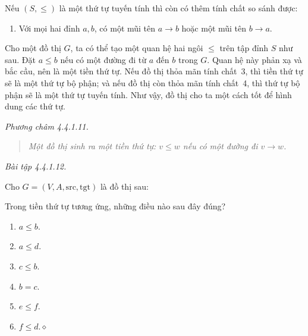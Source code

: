 Nếu $(S,\le)$ là một thứ tự tuyến tính thì còn có thêm tính chất so sánh được:
\begin{enumerate}[resume]
\item Với mọi hai đỉnh $a,b$, có một mũi tên $a\to b$ hoặc một mũi tên $b\to a$.
\end{enumerate}
Cho một đồ thị $G$, ta có thể tạo một quan hệ hai ngôi $\le$ trên tập đỉnh $S$ như sau. Đặt $a\le b$ nếu có một đường đi từ $a$ đến $b$ trong $G$. Quan hệ này phản xạ và bắc cầu, nên là một tiền thứ tự. Nếu đồ thị thỏa mãn tính chất~3, thì tiền thứ tự sẽ là một thứ tự bộ phận; và nếu đồ thị còn thỏa mãn tính chất~4, thì thứ tự bộ phận sẽ là một thứ tự tuyến tính. Như vậy, đồ thị cho ta một cách tốt để hình dung các thứ tự.

\noindent\textit{Phương châm 4.4.1.11.}\keepwithnext
\begin{quote}\emph{Một đồ thị sinh ra một tiền thứ tự: $v\le w$ nếu có một đường đi $v\to w$.}\end{quote}

\noindent\textit{Bài tập 4.4.1.12.}\keepwithnext

Cho $G=(V,A,\mathrm{src},\mathrm{tgt})$ là đồ thị sau:
\begin{center}
\end{center}
Trong tiền thứ tự tương ứng, những điều nào sau đây đúng?
\begin{enumerate}[label=\alph*.]
\item $a\le b$.
\item $a\le d$.
\item $c\le b$.
\item $b=c$.
\item $e\le f$.
\item $f\le d$.\nobreak\hfill$\diamond$
\end{enumerate}

